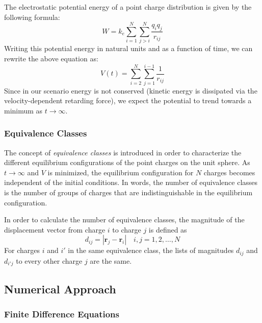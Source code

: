\documentclass[10pt]{article}
\begin{document}
The electrostatic potential energy of a point charge distribution is given by the following formula:
$$W=k_e \sum_{i=1}^N \sum_{j>i}^N \frac{q_i q_j}{r_{i j}}$$
Writing this potential energy in natural units and as a function of time, we can rewrite the above 
equation as:
\begin{equation}\label{potential}
V(t)=\sum_{i=2}^N \sum_{j=1}^{i-1} \frac{1}{r_{i j}}
\end{equation}
Since in our scenario energy is not conserved (kinetic energy is dissipated via the velocity-dependent
retarding force), we expect the potential to trend towards a minimum as $t \rightarrow \infty$.

\subsubsection*{Equivalence Classes}

The concept of \textit{equivalence classes} is introduced in order to characterize the different
equilibrium configurations of the point charges on the unit sphere. As $t \rightarrow \infty$ and 
$V$ is minimized, the equilibrium configuration for $N$ charges becomes independent of the initial
conditions. In words, the number of equivalence classes is the number of groups of charges that are 
indistinguishable in the equilibrium configuration. 

In order to calculate the number of equivalence classes, the magnitude of the displacement vector 
from charge $i$ to charge $j$ is defined as 
$$d_{i j}=\left|\mathbf{r}_j-\mathbf{r}_i\right| \quad i, j=1,2, \ldots, N$$
For charges $i$ and $i'$ in the same equivalence class, the lists of magnitudes $d_{i j}$ and 
$d_{i' j}$ to every other charge $j$ are the same.

\subsection*{Numerical Approach}

\subsubsection*{Finite Difference Equations}
\end{document}
